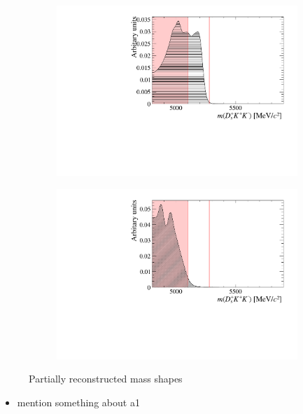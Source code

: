 \begin{figure}[!h]
\begin{subfigure}[t]{0.49\textwidth}
        \includegraphics[width=1.0\textwidth]{figs/B2DsKK/Bs2DsDs_4800_5900_Shape.pdf}
        \caption{\decay{\Bsb}{\Dsp\Dsm} }
    \end{subfigure}
    \begin{subfigure}[t]{0.49\textwidth}
        \includegraphics[width=1.0\textwidth]{figs/B2DsKK/Bs2DsstDs_4800_5900_Shape.pdf}
        \caption{\decay{\Bsb}{\Dssp\Dsm} }
    \end{subfigure}
    \caption{Partially reconstructed mass shapes}
    \label{fig:B2DsKK_part_reco_backgrounds}   
\end{figure}

{\color{Red}
\begin{itemize}
\item mention something about a1
\end{itemize}
}

